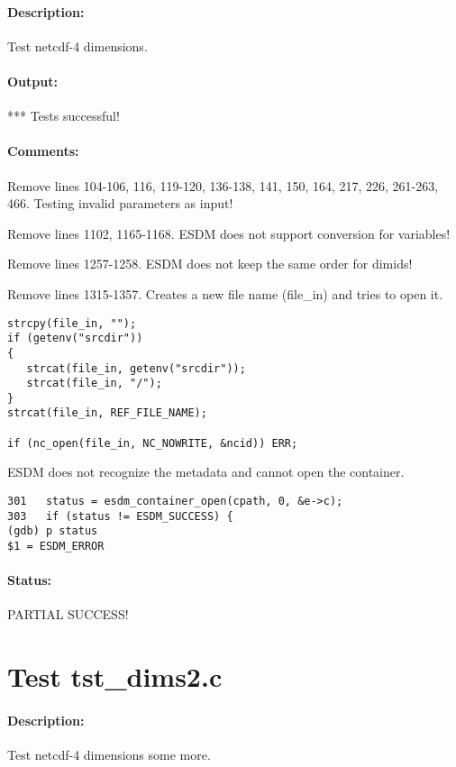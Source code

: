 \paragraph{Description:} Test netcdf-4 dimensions.

\paragraph{Output:} *** Tests successful!

\paragraph{Comments:} Remove lines 104-106, 116, 119-120, 136-138, 141, 150, 164, 217, 226, 261-263, 466. Testing invalid parameters as input!

Remove lines 1102, 1165-1168. ESDM does not support conversion for variables!

Remove lines 1257-1258. ESDM does not keep the same order for dimids!

Remove lines 1315-1357. Creates a new file name (file\_in) and tries to open it.

\begin{verbatim}
strcpy(file_in, "");
if (getenv("srcdir"))
{
   strcat(file_in, getenv("srcdir"));
   strcat(file_in, "/");
}
strcat(file_in, REF_FILE_NAME);

if (nc_open(file_in, NC_NOWRITE, &ncid)) ERR;
\end{verbatim}

ESDM does not recognize the metadata and cannot open the container.

\begin{verbatim}
301	  status = esdm_container_open(cpath, 0, &e->c);
303	  if (status != ESDM_SUCCESS) {
(gdb) p status
$1 = ESDM_ERROR
\end{verbatim}

\paragraph{Status:} PARTIAL SUCCESS!

{\color{blue}{Help, Julian!}}

\section{Test tst\_dims2.c}

\paragraph{Description:} Test netcdf-4 dimensions some more.

